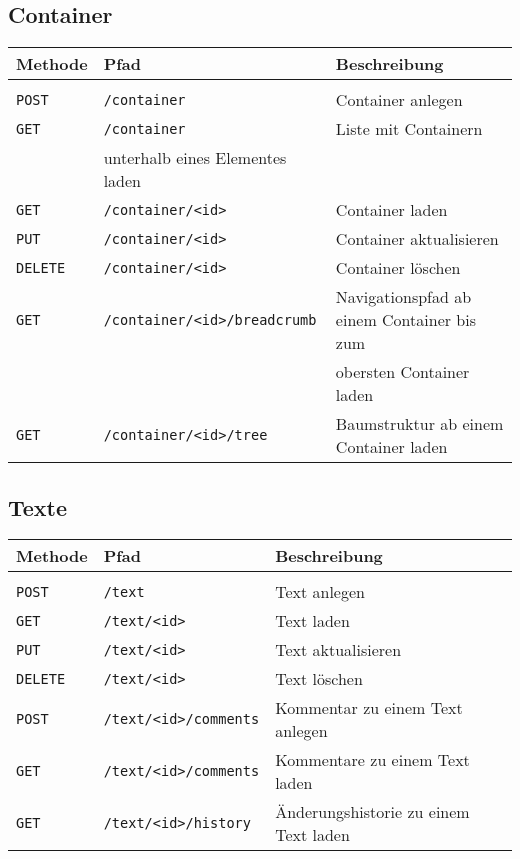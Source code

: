 \subsection{Container}

\begin{tabular}{@{}l l l}
\textbf{Methode} & \textbf{Pfad} & \textbf{Beschreibung}\\
\hline\\[-1.5ex]
\texttt{POST} & \texttt{/container}& Container anlegen\\
\texttt{GET} & \texttt{/container} & Liste mit Containern\\
& unterhalb eines Elementes laden\\
\texttt{GET} & \texttt{/container/<id>} & Container laden\\
\texttt{PUT} & \texttt{/container/<id>} & Container aktualisieren\\
\texttt{DELETE} & \texttt{/container/<id>} & Container löschen\\
\texttt{GET} & \texttt{/container/<id>/breadcrumb} & Navigationspfad ab einem Container bis zum\\
&&obersten Container laden\\
\texttt{GET} & \texttt{/container/<id>/tree} & Baumstruktur ab einem Container laden\\
\end{tabular}

\subsection{Texte}

\begin{tabular}{@{}l l l}
\textbf{Methode} & \textbf{Pfad} & \textbf{Beschreibung}\\
\hline\\[-1.5ex]
\texttt{POST} & \texttt{/text} & Text anlegen\\
\texttt{GET} & \texttt{/text/<id>} & Text laden\\
\texttt{PUT} & \texttt{/text/<id>} & Text aktualisieren\\
\texttt{DELETE} & \texttt{/text/<id>} & Text löschen\\
\texttt{POST} & \texttt{/text/<id>/comments} & Kommentar zu einem Text anlegen\\
\texttt{GET} & \texttt{/text/<id>/comments} & Kommentare zu einem Text laden\\
\texttt{GET} & \texttt{/text/<id>/history} & Änderungshistorie zu einem Text laden\\
\end{tabular}

